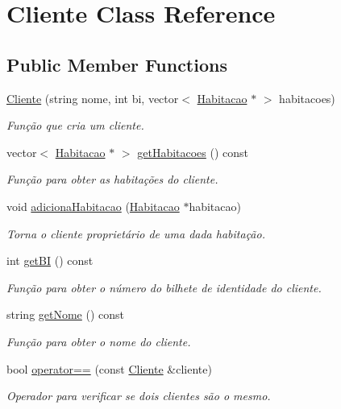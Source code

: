 \hypertarget{class_cliente}{}\section{Cliente Class Reference}
\label{class_cliente}
\subsection*{Public Member Functions}
\begin{DoxyCompactItemize}
\item 
\hyperlink{class_cliente_a2bccaf416e225c0f925e69ec132f415a}{Cliente} (string nome, int bi, vector$<$ \hyperlink{class_habitacao}{Habitacao} $\ast$ $>$ habitacoes)
\begin{DoxyCompactList}\small\item\em Função que cria um cliente. \end{DoxyCompactList}\item 
vector$<$ \hyperlink{class_habitacao}{Habitacao} $\ast$ $>$ \hyperlink{class_cliente_a6625c1bb73828bcaa067f41b7590408f}{get\+Habitacoes} () const 
\begin{DoxyCompactList}\small\item\em Função para obter as habitações do cliente. \end{DoxyCompactList}\item 
void \hyperlink{class_cliente_a7fafc50727fce6fef1d06e231ed87f3a}{adiciona\+Habitacao} (\hyperlink{class_habitacao}{Habitacao} $\ast$habitacao)
\begin{DoxyCompactList}\small\item\em Torna o cliente proprietário de uma dada habitação. \end{DoxyCompactList}\item 
int \hyperlink{class_cliente_a800f49dc0761b67a61e563ca9a1478a7}{get\+BI} () const 
\begin{DoxyCompactList}\small\item\em Função para obter o número do bilhete de identidade do cliente. \end{DoxyCompactList}\item 
string \hyperlink{class_cliente_a0325de899469e2fed48ffda2b5b291cf}{get\+Nome} () const 
\begin{DoxyCompactList}\small\item\em Função para obter o nome do cliente. \end{DoxyCompactList}\item 
bool \hyperlink{class_cliente_a1d84706fef989238713cf6efe3824696}{operator==} (const \hyperlink{class_cliente}{Cliente} \&cliente)
\begin{DoxyCompactList}\small\item\em Operador para verificar se dois clientes são o mesmo. \end{DoxyCompactList}\end{DoxyCompactItemize}


